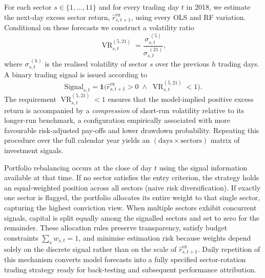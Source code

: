 For each sector $s\in\{1,\dots,11\}$ and for every trading day $t$ in 2018, we estimate the next-day excess sector return, $\widehat{r}^{\text{ex}}_{s,t+1}$, using every OLS and RF variation. Conditional on these forecasts we construct a volatility ratio%
\[
\operatorname{VR}_{s,t}^{(5,21)}=\frac{\sigma_{s,t}^{\;(5)}}{\sigma_{s,t}^{\;(21)}},
\]
where $\sigma_{s,t}^{\;(h)}$ is the realised volatility of sector $s$ over the previous $h$ trading days.  A binary trading signal is issued according to
\[
\text{Signal}_{s,t}=\mathbf{1}
\!\bigl(
\widehat{r}^{\text{ex}}_{s,t+1}>0
\;\wedge\;
\operatorname{VR}_{s,t}^{(5,21)}<1
\bigr).
\]
The requirement $\operatorname{VR}_{s,t}^{(5,21)}<1$ ensures that the model-implied positive excess return is accompanied by a \emph{compression} of short-run volatility relative to its longer-run benchmark, a configuration empirically associated with more favourable risk-adjusted pay-offs and lower drawdown probability.  Repeating this procedure over the full calendar year yields an $(\text{days}\times\text{sectors})$ matrix of investment signals.


Portfolio rebalancing occurs at the close of day $t$ using the signal information available at that time.  If no sector satisfies the entry criterion, the strategy holds an equal-weighted position across all sectors (naive risk diversification).  If exactly one sector is flagged, the portfolio allocates its entire weight to that single sector, capturing the highest conviction view.  When multiple sectors exhibit concurrent signals, capital is split equally among the signalled sectors and set to zero for the remainder.  These allocation rules preserve transparency, satisfy budget constraints $\sum_{s}w_{s,t}=1$, and minimise estimation risk because weights depend solely on the discrete signal rather than on the scale of $\widehat{r}^{\text{ex}}_{s,t+1}$.  Daily repetition of this mechanism converts model forecasts into a fully specified sector-rotation trading strategy ready for back-testing and subsequent performance attribution.








